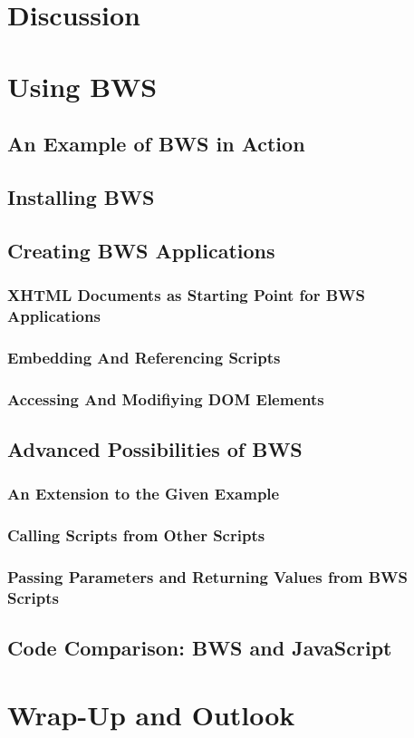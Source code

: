       
     
\chapter{Discussion}

\chapter{Using BWS}

 \section{An Example of BWS in Action}
 \section{Installing BWS}
 \section{Creating BWS Applications}
 \label{sec:CreatingBWSApplications}
 
  \subsection{XHTML Documents as Starting Point for BWS Applications}
  \label{sec:XHTMLDocumentsAsStartingPoint}

   

  \subsection{Embedding And Referencing Scripts}

 

  \subsection{Accessing And Modifiying DOM Elements}


 \section{Advanced Possibilities of BWS}
  \subsection{An Extension to the Given Example}
  \subsection{Calling Scripts from Other Scripts}
  \subsection{Passing Parameters and Returning Values from BWS Scripts}
 \section{Code Comparison: BWS and JavaScript}
\chapter{Wrap-Up and Outlook}